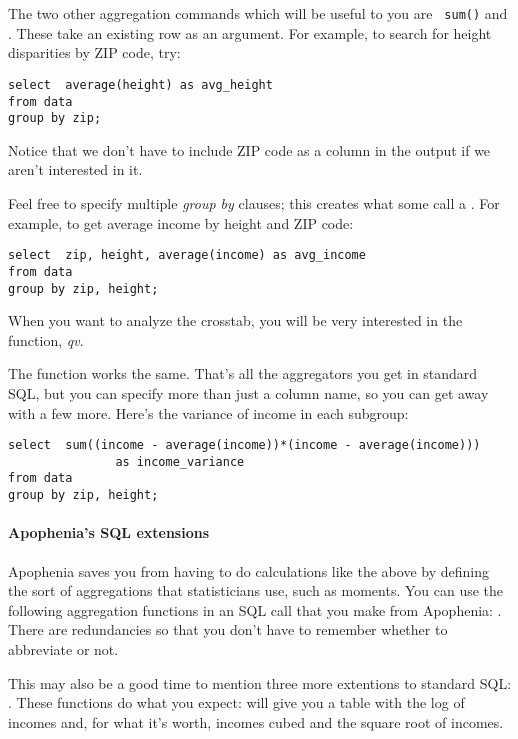 The two other aggregation commands which will be useful to you are {\tt
sum()} and . These take an existing row as an argument.
For example, to search for height disparities by ZIP code, try:
\begin{lstlisting}
select  average(height) as avg_height
from data
group by zip;
\end{lstlisting}
Notice that we don't have to include ZIP code as a column in the output
if we aren't interested in it.

Feel free to specify multiple {\sl group by} clauses; this creates what
some call a . For example, to get average income by
height and ZIP code: 
\begin{lstlisting}
select  zip, height, average(income) as avg_income
from data
group by zip, height;
\end{lstlisting}

When you want to analyze the crosstab, you will be very
interested in the  function, {\em qv}.

The function  works the same. That's all the aggregators you
get in standard SQL, but you can specify more than just a column name, so you can get
away with a few more. Here's the variance of income in each subgroup:
\begin{lstlisting}
select  sum((income - average(income))*(income - average(income))) 
               as income_variance
from data
group by zip, height;
\end{lstlisting}

\paragraph{Apophenia's SQL extensions}
Apophenia saves you from having to do calculations like the above by
defining the sort of aggregations that statisticians use, such as
moments. You can use the following aggregation functions in an SQL
call that you make from Apophenia: 
. There are redundancies so that you don't have to remember
whether to abbreviate or not.

This may also be a good time to mention three more extentions to
standard SQL: . These functions do what you
expect:  will give
you a table with the log of incomes and, for what it's worth, incomes
cubed and the square root of incomes.

